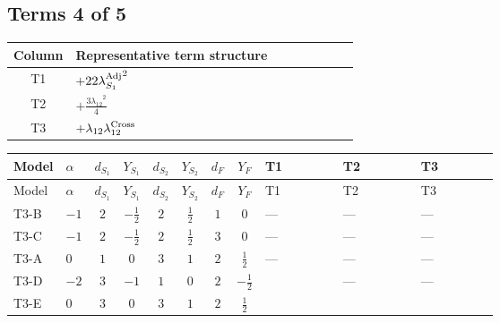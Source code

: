 \documentclass[8pt]{article}
\begin{document}
\begin{landscape}
\subsection*{Terms 4 of 5}
\begin{center}
\begin{tabular}{@{}c >{\raggedright\arraybackslash}p{0.82\linewidth}@{}}
\toprule
Column & Representative term structure \\
\midrule
T1 & \(\displaystyle +22 {\lambda_{S_1}^{\rm Adj}}^2\) \\
\midrule
T2 & \(\displaystyle +\frac{3 {\lambda_{12}}^2}{4}\) \\
\midrule
T3 & \(\displaystyle +{\lambda_{12}} {\lambda_{12}^{\rm Cross}}\) \\
\midrule
\bottomrule
\end{tabular}
\end{center}
\smallskip
\tiny
\begin{longtable}{@{}llcccccc >{\raggedright\arraybackslash}p{0.21\linewidth} >{\raggedright\arraybackslash}p{0.21\linewidth} >{\raggedright\arraybackslash}p{0.21\linewidth}@{}}
\toprule
Model & $\alpha$ & $d_{S_1}$ & $Y_{S_1}$ & $d_{S_2}$ & $Y_{S_2}$ & $d_F$ & $Y_F$ & T1 & T2 & T3 \\
\midrule
\endfirsthead
\toprule
Model & $\alpha$ & $d_{S_1}$ & $Y_{S_1}$ & $d_{S_2}$ & $Y_{S_2}$ & $d_F$ & $Y_F$ & T1 & T2 & T3 \\
\midrule
\endhead
T3-B & $-1$ & $2$ & $-\frac{1}{2}$ & $2$ & $\frac{1}{2}$ & $1$ & $0$ & --- & --- & --- \\
\midrule
T3-C & $-1$ & $2$ & $-\frac{1}{2}$ & $2$ & $\frac{1}{2}$ & $3$ & $0$ & --- & --- & --- \\
\midrule
T3-A & $0$ & $1$ & $0$ & $3$ & $1$ & $2$ & $\frac{1}{2}$ & --- & --- & --- \\
\midrule
T3-D & $-2$ & $3$ & $-1$ & $1$ & $0$ & $2$ & $-\frac{1}{2}$ & \scriptsize\adjustbox{max width=\linewidth}{$\begin{gathered} +22 {\lambda_{S_1}^{\rm Adj}}^2\end{gathered}$} & --- & --- \\
\midrule
T3-E & $0$ & $3$ & $0$ & $3$ & $1$ & $2$ & $\frac{1}{2}$ & \scriptsize\adjustbox{max width=\linewidth}{$\begin{gathered} +22 {\lambda_{S_1}^{\rm Adj}}^2\end{gathered}$} & \scriptsize\adjustbox{max width=\linewidth}{$\begin{gathered} +\frac{3 {\lambda_{12}}^2}{4}\end{gathered}$} & \scriptsize\adjustbox{max width=\linewidth}{$\begin{gathered} +{\lambda_{12}} {\lambda_{12}^{\rm Cross}}\end{gathered}$} \\
\midrule
\bottomrule
\end{longtable}
\clearpage

\end{landscape}
\end{document}
